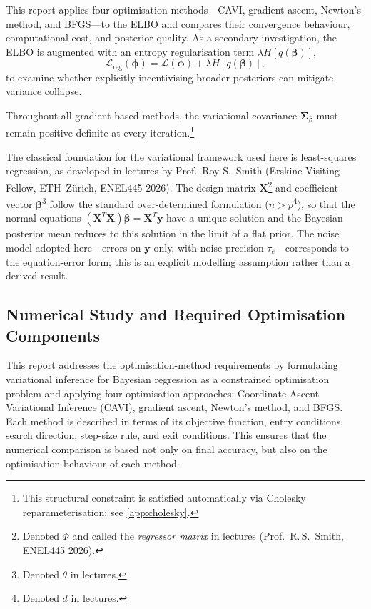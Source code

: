 \documentclass[11pt,a4paper]{article}
\begin{document}
This report applies four optimisation methods---CAVI, gradient ascent, Newton's method, and BFGS---to the ELBO and compares their convergence behaviour, computational cost, and posterior quality.
As a secondary investigation, the ELBO is augmented with an entropy regularisation term $\lambda H[q(\bm{\beta})]$,
\begin{equation*}
    \mathcal{L}_{\mathrm{reg}}(\bm{\phi}) = \mathcal{L}(\bm{\phi}) + \lambda H[q(\bm{\beta})],
\end{equation*}
to examine whether explicitly incentivising broader posteriors can mitigate variance collapse.

Throughout all gradient-based methods, the variational covariance $\bm{\Sigma}_\beta$ must
remain positive definite at every iteration.\footnote{This structural constraint is satisfied automatically
via Cholesky reparameterisation; see \ref{app:cholesky}.}

The classical foundation for the variational framework used here is least-squares regression,
as developed in lectures by Prof.\ Roy S.\ Smith (Erskine Visiting Fellow, ETH~Z\"{u}rich,
ENEL445 2026). The design matrix $\bm{X}$\footnote{Denoted $\Phi$ and called the
\emph{regressor matrix} in lectures (Prof.\ R.\,S.\ Smith, ENEL445 2026).} and coefficient
vector $\bm{\beta}$\footnote{Denoted $\theta$ in lectures.} follow the standard
over-determined formulation ($n > p$\footnote{Denoted $d$ in lectures.}), so that the normal
equations $(\bm{X}^T\bm{X})\bm{\beta} = \bm{X}^T\bm{y}$ have a unique solution and the
Bayesian posterior mean reduces to this solution in the limit of a flat prior. The noise model
adopted here---errors on $\bm{y}$ only, with noise precision $\tau_e$---corresponds to the
equation-error form; this is an explicit modelling assumption rather than a derived result.


 
\subsection{Numerical Study and Required Optimisation Components}

This report addresses the optimisation-method requirements by formulating variational inference for Bayesian regression as a constrained optimisation problem and applying four optimisation approaches: Coordinate Ascent Variational Inference (CAVI), gradient ascent, Newton's method, and BFGS. Each method is described in terms of its objective function, entry conditions, search direction, step-size rule, and exit conditions. This ensures that the numerical comparison is based not only on final accuracy, but also on the optimisation behaviour of each method.
\end{document}
